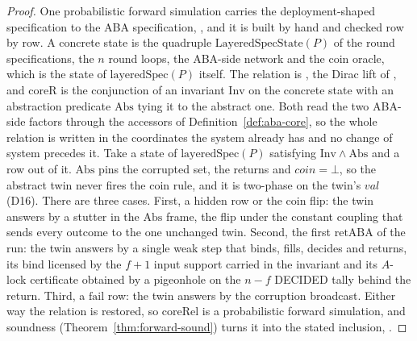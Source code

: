 \begin{proof}\leanok
  One probabilistic forward simulation carries the deployment-shaped specification to the ABA specification, , and it is built by hand and checked row by row.
  A concrete state is the quadruple $\mathrm{LayeredSpecState}(P)$ of the round specifications, the $n$ round loops, the ABA-side network and the coin oracle, which is the state of $\mathrm{layeredSpec}(P)$ itself.
  The relation is , the Dirac lift of , and $\mathrm{coreR}$ is the conjunction of an invariant $\mathrm{Inv}$ on the concrete state with an abstraction predicate $\mathrm{Abs}$ tying it to the abstract one.
  Both read the two ABA-side factors through the accessors of Definition~\ref{def:aba-core}, so the whole relation is written in the coordinates the system already has and no change of system precedes it.
  Take a state of $\mathrm{layeredSpec}(P)$ satisfying $\mathrm{Inv} \wedge \mathrm{Abs}$ and a row out of it.
  $\mathrm{Abs}$ pins the corrupted set, the returns and $coin = \bot$, so the abstract twin never fires the coin rule, and it is two-phase on the twin's $val$ (D16).
  There are three cases.
  First, a hidden row or the coin flip: the twin answers by a stutter in the $\mathrm{Abs}$ frame, the flip under the constant coupling that sends every outcome to the one unchanged twin.
  Second, the first $\mathrm{retABA}$ of the run: the twin answers by a single weak step that binds, fills, decides and returns, its bind licensed by the $f{+}1$ input support carried in the invariant and its $A$-lock certificate obtained by a pigeonhole on the $n-f$ DECIDED tally behind the return.
  Third, a $\mathrm{fail}$ row: the twin answers by the corruption broadcast.
  Either way the relation is restored, so $\mathrm{coreRel}$ is a probabilistic forward simulation, and soundness (Theorem~\ref{thm:forward-sound}) turns it into the stated inclusion, .
\end{proof}
